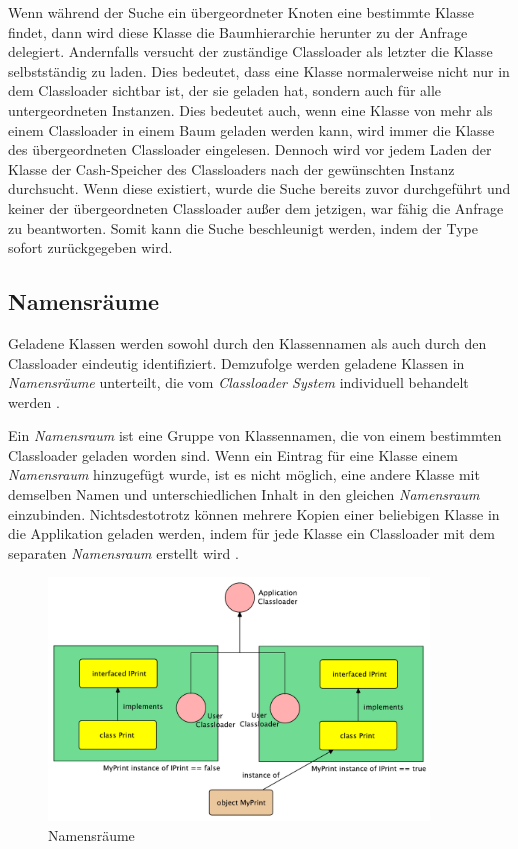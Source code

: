     Wenn während der Suche ein übergeordneter Knoten eine bestimmte Klasse findet, dann wird diese Klasse die Baumhierarchie herunter zu der Anfrage delegiert. Andernfalls versucht der zuständige Classloader als letzter die Klasse selbstständig zu laden. Dies bedeutet, dass eine Klasse normalerweise nicht nur in dem Classloader sichtbar ist, der sie geladen hat, sondern auch für alle untergeordneten Instanzen. Dies bedeutet auch, wenn eine Klasse von mehr als einem Classloader in einem Baum geladen werden kann, wird immer die Klasse des übergeordneten Classloader eingelesen. Dennoch wird vor jedem Laden der Klasse der Cash-Speicher des Classloaders nach der gewünschten Instanz durchsucht. Wenn diese existiert, wurde die Suche bereits zuvor durchgeführt und keiner der übergeordneten Classloader außer dem jetzigen, war fähig die Anfrage zu beantworten. Somit kann die Suche beschleunigt werden, indem der Type sofort zurückgegeben wird. \cite{parentDelegationModel}


  \subsection{Namensräume} \label{sec:nam}

    Geladene Klassen werden sowohl durch den Klassennamen als auch durch den Classloader eindeutig identifiziert. Demzufolge werden geladene Klassen in \textit{Namensräume} unterteilt, die vom \textit{Classloader System} individuell behandelt werden \cite{namespaces}. 

    Ein \textit{Namensraum} ist eine Gruppe von Klassennamen, die von einem bestimmten Classloader geladen worden sind. Wenn ein Eintrag für eine Klasse einem \textit{Namensraum} hinzugefügt wurde, ist es nicht möglich, eine andere Klasse mit demselben Namen und unterschiedlichen Inhalt in den gleichen \textit{Namensraum} einzubinden. Nichtsdestotrotz können mehrere Kopien einer beliebigen Klasse in die Applikation geladen werden, indem für jede Klasse ein Classloader mit dem separaten \textit{Namensraum} erstellt wird \cite{customClDiffSpace}. 

    \begin{figure}[h]
      \centering
      \includegraphics[width=0.9\textwidth]{material/images/namespace.pdf}
      \caption{Namensräume \cite{customClDiffSpace}}
      \label{fig:nam}
    \end{figure}

